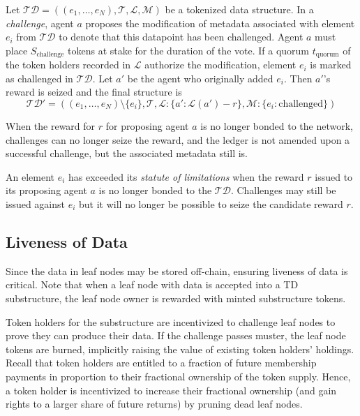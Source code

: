 \documentclass{llncs}
\begin{document}
\begin{definition}[Challenge]
Let $\mathcal{TD} = \left ((e_1,\dotsc, e_N), \mathcal{T}, \mathcal{L}, \mathcal{M} \right)$ be a tokenized data structure. In a \textit{challenge}, agent $a$ proposes the modification of metadata associated with element $e_i$ from $\mathcal{TD}$ to denote that this datapoint has been challenged. Agent $a$ must place $S_{\text{challenge}}$ tokens at stake for the duration of the vote. If a quorum $t_{\text{quorum}}$ of the token holders recorded in $\mathcal{L}$ authorize the modification, element $e_i$ is marked as challenged in $\mathcal{TD}$. Let $a'$ be the agent who originally added $e_i$. Then $a'$'s reward is seized and the final structure is 
\begin{equation*}
\mathcal{TD}' = \left((e_1,\dotsc, e_N) \setminus \{e_i\}, \mathcal{T}, \mathcal{L}:\{a': \mathcal{L}(a') - r\}, \mathcal{M}:\{e_i: \text{challenged} \}\right )    
\end{equation*}
\end{definition}

When the reward for $r$ for proposing agent $a$ is no longer bonded to the network, challenges can no longer seize the reward, and the ledger is not amended upon a successful challenge, but the associated metadata still is.


\begin{definition}
An element $e_i$ has exceeded its \textit{statute of limitations} when the reward $r$ issued to its proposing agent $a$ is no longer bonded to the $\mathcal{TD}$. Challenges may still be issued against $e_i$ but it will no longer be possible to seize the candidate reward $r$.
\end{definition}



\subsection{Liveness of Data}
Since the data in leaf nodes may be stored off-chain, ensuring liveness of data is critical. Note that when a leaf node with data is accepted into a TD substructure, the leaf node owner is rewarded with minted substructure tokens.

Token holders for the substructure are incentivized to challenge leaf nodes to prove they can produce their data. If the challenge passes muster, the leaf node tokens are burned, implicitly raising the value of existing token holders' holdings. Recall that token holders are entitled to a fraction of future membership payments in proportion to their fractional ownership of the token supply. Hence, a token holder is incentivized to increase their fractional ownership (and gain rights to a larger share of future returns) by pruning dead leaf nodes.
\end{document}
